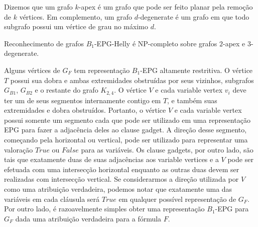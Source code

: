 Dizemos que um grafo $k$-apex é um grafo que pode ser feito planar pela remoção de $k$ vértices. Em complemento, um grafo $d$-degenerate é um grafo em que todo subgrafo possui um vértice de grau no máximo $d$.

\begin{corollary}
 \label{coro:2apexAnd3degenerate}
{\sc Reconhecimento de grafos $B_{1}$-EPG-Helly} é NP-completo sobre grafos $2$-apex e $3$-degenerate.
\end{corollary}

Alguns vértices de  $G_F$ tem representação $B_1$-EPG altamente restritiva. O vértice $T$ possui sua dobra e ambas extremidades obstruídas por seus vizinhos, subgrafos $G_{B1}$, $G_{B2}$ e o restante do grafo $K_{2,4}$. O vértice $V$ e cada  variable vertex $v_i$ deve ter um de seus segmentos internamente contigo em  $T$, e também suas extremidades e dobra obstruídos.  Portanto, o vértice $V$ e cada 
variable vertex possui somente um segmento cada que pode ser utilizado em uma representação EPG para fazer a adjacência deles ao clause gadget. A direção desse segmento, começando pela horizontal ou vertical, pode ser utilizado para representar uma valoração $True$ ou $False$ para as variáveis. Os  clause gadgets, por outro lado, são tais que exatamente duas de suas adjacências aos variable vertices e a $V$ pode ser efetuada com uma intersecção horizontal enquanto as outras duas  devem ser realizadas com intersecção vertical. Se considerarmos a direção utilizada por  $V$ como uma atribuição verdadeira, podemos notar que exatamente uma das variáveis em cada cláusula será $True$ em qualquer possível representação de  $G_F$. Por outro lado, é razoavelmente simples obter uma representação $B_1$-EPG para $G_F$ dada uma atribuição verdadeira para a fórmula $F$.



